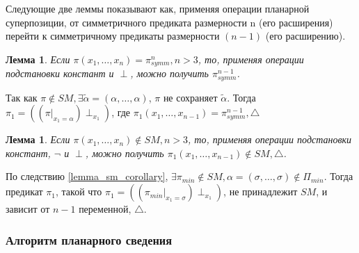 \documentclass[12pt]{article}
\newtheorem{lemma}[theorem]{Лемма}
\newenvironment{proof}[1][Доказательство]{\begin{trivlist}
\item[\hskip \labelsep {\bfseries #1}]}{\end{trivlist}}
\begin{document}
Следующие две леммы показывают как, применяя операции планарной суперпозиции, от симметричного предиката
размерности n (его расширения) перейти к симметричному предикаты размерности $(n-1)$ (его расширению).

\begin{lemma}
\label{eq:svedenie1}
Если $\pi(x_1, \dots, x_n) = \pi_{symm}^n, n > 3$, то, 
применяя операции подстановки констант и $\perp$, можно получить $\pi_{symm}^{n-1}$.
\end{lemma}

\begin{proof}
Так как 
$\pi \notin SM, \exists \widetilde{\alpha} = (\alpha, \dots, \alpha)$, $\pi$ не сохраняет $\widetilde{\alpha}$.
Тогда 
$\pi_1 = ( (\pi|_{x_1=\alpha}) \perp_{x_1} )$, где $\pi_1(x_1, \dots, x_{n-1}) = \pi_{symm}^{n-1}, \bigtriangleup$
\end{proof}

\begin{lemma}
\label{eq:svedenie2}
Если $\pi(x_1, \dots, x_n) \notin SM, n > 3$, то, применяя операции подстановки констант, $\neg$ и $\perp$,
можно получить $\pi_1(x_1, \dots, x_{n-1}) \notin SM, \bigtriangleup$.
\end{lemma}

\begin{proof}
По следствию \ref{lemma_sm_corollary}, 
$\exists \pi_{min} \notin SM, \alpha=(\sigma, \dots, \sigma) \notin \Pi_{min}$. Тогда предикат $\pi_1$, такой что
$\pi_1 = ( (\pi_{min}|_{x_1=\sigma}) \perp_{x_1} )$, не принадлежит $SM$, и зависит от $n-1$ переменной, $\bigtriangleup$.
\end{proof}

\subsubsection{Алгоритм планарного сведения}
\end{document}
